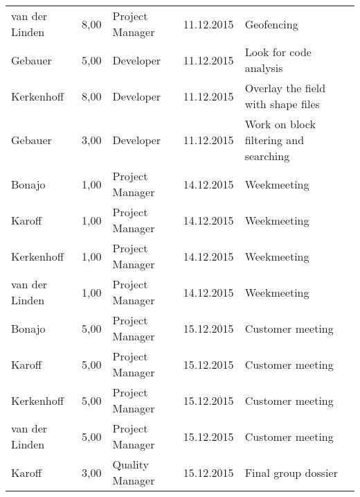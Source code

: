 \begin{longtable}{ l r p{2cm} c p{4cm} }
		van der Linden          & 8,00           & Project Manager & 11.12.2015    & Geofencing                                                                      \\
		Gebauer                 & 5,00           & Developer       & 11.12.2015    & Look for code analysis                                                          \\
		Kerkenhoff              & 8,00           & Developer       & 11.12.2015    & Overlay the field with shape files                                              \\
		Gebauer                 & 3,00           & Developer       & 11.12.2015    & Work on block filtering and searching                                           \\
		Bonajo                  & 1,00           & Project Manager & 14.12.2015    & Weekmeeting                                                                     \\
		Karoff                  & 1,00           & Project Manager & 14.12.2015    & Weekmeeting                                                                     \\
		Kerkenhoff              & 1,00           & Project Manager & 14.12.2015    & Weekmeeting                                                                     \\
		van der Linden          & 1,00           & Project Manager & 14.12.2015    & Weekmeeting                                                                     \\
		Bonajo                  & 5,00           & Project Manager & 15.12.2015    & Customer meeting                                                                 \\
		Karoff                  & 5,00           & Project Manager & 15.12.2015    & Customer meeting                                                                 \\
		Kerkenhoff              & 5,00           & Project Manager & 15.12.2015    & Customer meeting                                                                 \\
		van der Linden          & 5,00           & Project Manager & 15.12.2015    & Customer meeting                                                                 \\
		Karoff                  & 3,00           & Quality Manager & 15.12.2015    & Final group dossier                                                             \\

\end{longtable}
